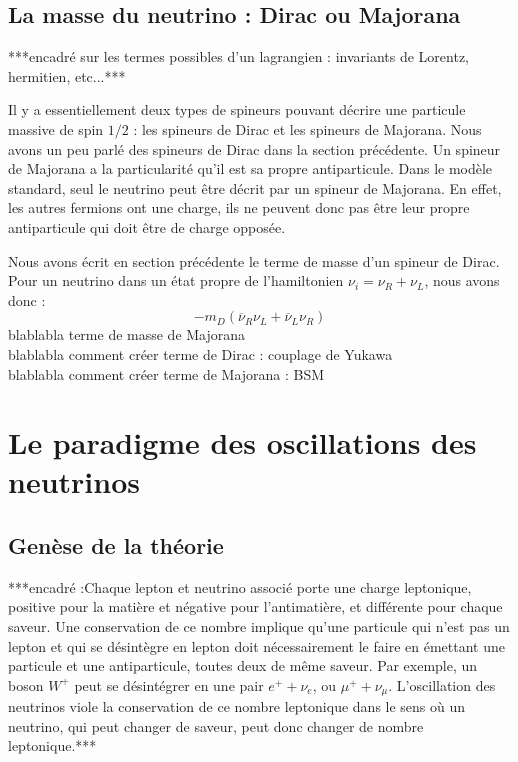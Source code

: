         \subsection{La masse du neutrino : Dirac ou Majorana}\label{sec::dirac_majorana}
        
	        ***encadré sur les termes possibles d'un lagrangien : invariants de Lorentz, hermitien, etc...***
        
	        Il y a essentiellement deux types de spineurs pouvant décrire une particule massive de spin $1/2$ : les spineurs de Dirac et les spineurs de Majorana. Nous avons un peu parlé des spineurs de Dirac dans la section précédente. Un spineur de Majorana a la particularité qu'il est sa propre antiparticule. Dans le modèle standard, seul le neutrino peut être décrit par un spineur de Majorana. En effet, les autres fermions ont une charge, ils ne peuvent donc pas être leur propre antiparticule qui doit être de charge opposée.
	        
	        Nous avons écrit en section précédente le terme de masse d'un spineur de Dirac. Pour un neutrino dans un état propre de l'hamiltonien $\nu_i=\nu_R+\nu_L$, nous avons donc : 
	        \begin{equation}
	        	-m_D(\overline{\nu}_R \nu_L + \overline{\nu}_L \nu_R)
	        \end{equation}
	        blablabla terme de masse de Majorana \\
	        blablabla comment créer terme de Dirac : couplage de Yukawa\\
	        blablabla comment créer terme de Majorana : BSM\\
    
    \section{Le paradigme des oscillations des neutrinos}
    
        \subsection{Genèse de la théorie}
        
        ***encadré :Chaque lepton et neutrino associé porte une charge leptonique, positive pour la matière et négative pour l'antimatière, et différente pour chaque saveur. Une conservation de ce nombre implique qu'une particule qui n'est pas un lepton et qui se désintègre en lepton doit nécessairement  le faire en émettant une particule et une antiparticule, toutes deux de même saveur. Par exemple, un boson $W^+$ peut se désintégrer en une pair $e^+ + \nu_e$, ou $\mu^+ + \nu_{\mu}$. L'oscillation des neutrinos viole la conservation de ce nombre leptonique dans le sens où un neutrino, qui peut changer de saveur, peut donc changer de nombre leptonique.***
    
